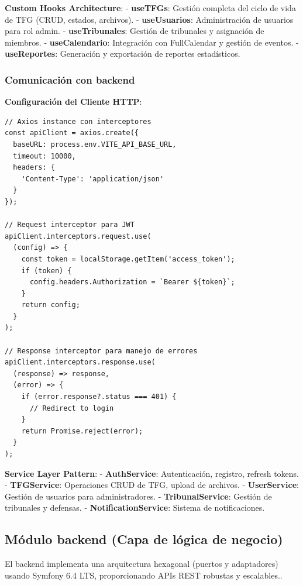 \documentclass[12pt,a4paper,oneside]{report}
\begin{document}
\textbf{Custom Hooks Architecture}: - \textbf{useTFGs}: Gestión completa
del ciclo de vida de TFG (CRUD, estados, archivos). -
\textbf{useUsuarios}: Administración de usuarios para rol admin. -
\textbf{useTribunales}: Gestión de tribunales y asignación de miembros.
- \textbf{useCalendario}: Integración con FullCalendar y gestión de
eventos. - \textbf{useReportes}: Generación y exportación de reportes
estadísticos.

\subsubsection{Comunicación con
backend}\label{comunicaciuxf3n-con-backend}

\textbf{Configuración del Cliente HTTP}:

\begin{lstlisting}
// Axios instance con interceptores
const apiClient = axios.create({
  baseURL: process.env.VITE_API_BASE_URL,
  timeout: 10000,
  headers: {
    'Content-Type': 'application/json'
  }
});

// Request interceptor para JWT
apiClient.interceptors.request.use(
  (config) => {
    const token = localStorage.getItem('access_token');
    if (token) {
      config.headers.Authorization = `Bearer ${token}`;
    }
    return config;
  }
);

// Response interceptor para manejo de errores
apiClient.interceptors.response.use(
  (response) => response,
  (error) => {
    if (error.response?.status === 401) {
      // Redirect to login
    }
    return Promise.reject(error);
  }
);
\end{lstlisting}

\textbf{Service Layer Pattern}: - \textbf{AuthService}: Autenticación,
registro, refresh tokens. - \textbf{TFGService}: Operaciones CRUD de
TFG, upload de archivos. - \textbf{UserService}: Gestión de usuarios
para administradores. - \textbf{TribunalService}: Gestión de tribunales
y defensas. - \textbf{NotificationService}: Sistema de notificaciones.

\subsection{Módulo backend (Capa de lógica de
negocio)}\label{muxf3dulo-backend-capa-de-luxf3gica-de-negocio}

El backend implementa una arquitectura hexagonal (puertos y adaptadores)
usando Symfony 6.4 LTS, proporcionando APIs REST robustas y escalables..
\end{document}
